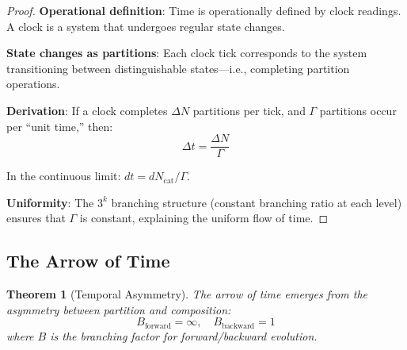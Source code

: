 \documentclass[twocolumn,10pt,a4paper]{article}
\newtheorem{theorem}{Theorem}[section]
\theoremstyle{definition}
\theoremstyle{remark}
\begin{document}
\begin{proof}
\textbf{Operational definition}: Time is operationally defined by clock readings. A clock is a system that undergoes regular state changes.

\textbf{State changes as partitions}: Each clock tick corresponds to the system transitioning between distinguishable states---i.e., completing partition operations.

\textbf{Derivation}: If a clock completes $\Delta N$ partitions per tick, and $\Gamma$ partitions occur per ``unit time,'' then:
\begin{equation}
    \Delta t = \frac{\Delta N}{\Gamma}
\end{equation}

In the continuous limit: $dt = dN_{\text{cat}}/\Gamma$.

\textbf{Uniformity}: The $3^k$ branching structure (constant branching ratio at each level) ensures that $\Gamma$ is constant, explaining the uniform flow of time.
\end{proof}

\subsection{The Arrow of Time}

\begin{theorem}[Temporal Asymmetry]
\label{thm:arrow}
The arrow of time emerges from the asymmetry between partition and composition:
\begin{equation}
    B_{\text{forward}} = \infty, \quad B_{\text{backward}} = 1
\end{equation}
where $B$ is the branching factor for forward/backward evolution.
\end{theorem}
\end{document}
